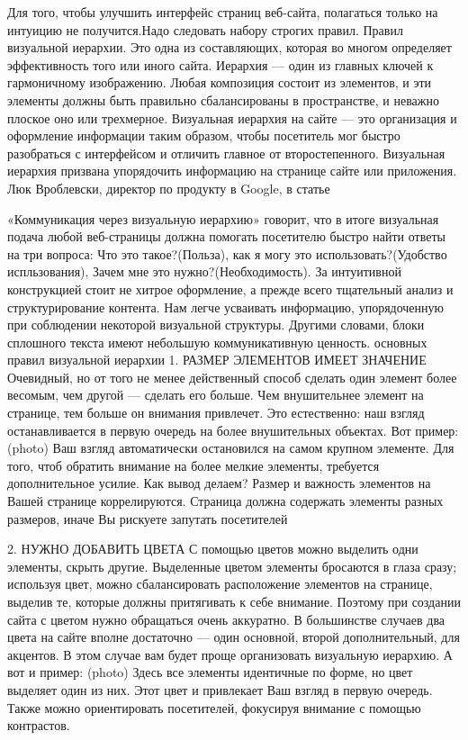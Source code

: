 \documentclass[10pt,twoside,slovak,a4paper]{article}
\begin{document}
Для того, чтобы улучшить интерфейс страниц веб-сайта, полагаться только на интуицию не получится.Надо следовать набору строгих правил. Правил визуальной иерархии. Это одна из составляющих, которая во многом определяет эффективность того или иного сайта. Иерархия — один из главных ключей к гармоничному изображению. Любая композиция состоит из элементов, и эти элементы должны быть правильно сбалансированы в пространстве, и неважно плоское оно или трехмерное. Визуальная иерархия на сайте — это организация и оформление информации таким образом, чтобы посетитель мог быстро разобраться с интерфейсом и отличить главное от второстепенного. Визуальная иерархия призвана упорядочить информацию на странице сайте или приложения.  Люк Вроблевски, директор по продукту в Google, в статье
\begin{comment}
(http://static.lukew.com/pageheirarchy_lukew_03192008.pdf)
\end{comment}
«Коммуникация через визуальную иерархию» говорит, что в итоге визуальная подача любой веб-страницы должна помогать посетителю быстро найти ответы на три вопроса: Что это такое?(Польза), как я могу это использовать?(Удобство испльзования), Зачем мне это нужно?(Необходимость). За интуитивной конструкцией стоит не хитрое оформление, а прежде всего тщательный анализ и структурирование контента. Нам легче усваивать информацию, упорядоченную при соблюдении некоторой визуальной структуры. Другими словами, блоки сплошного текста имеют небольшую коммуникативную ценность.
 основных правил визуальной иерархии
1. РАЗМЕР ЭЛЕМЕНТОВ ИМЕЕТ ЗНАЧЕНИЕ
Очевидный, но от того не менее действенный способ сделать один элемент более весомым, чем другой — сделать его больше.
Чем внушительнее элемент на странице, тем больше он внимания привлечет. Это естественно: наш взгляд останавливается в первую очередь на более внушительных объектах. Вот пример: (photo)
Ваш взгляд автоматически остановился на самом крупном элементе. Для того, чтоб обратить внимание на более мелкие элементы, требуется дополнительное усилие. 
Как вывод делаем? Размер и важность элементов на Вашей странице коррелируются. Страница должна содержать элементы разных размеров, иначе Вы рискуете запутать посетителей

2. НУЖНО ДОБАВИТЬ ЦВЕТА
С помощью цветов можно выделить одни элементы, скрыть другие. Выделенные цветом элементы бросаются в глаза сразу; используя цвет, можно сбалансировать расположение элементов на странице, выделив те, которые должны притягивать к себе внимание. 
Поэтому при создании сайта с цветом нужно обращаться очень аккуратно. В большинстве случаев два цвета на сайте вполне достаточно — один основной, второй дополнительный, для акцентов. В этом случае вам будет проще организовать визуальную иерархию. А вот и пример: (photo)
Здесь все элементы идентичные по форме, но цвет выделяет один из них. Этот цвет и привлекает Ваш взгляд в первую очередь. Также можно ориентировать посетителей, фокусируя внимание с помощью контрастов.
\end{document}
